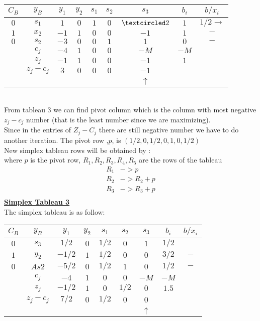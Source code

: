 \documentclass[12pt,a4paper]{article}
\begin{document}
		\begin{tabular}{cc|ccccc|cc}
			\hline 
			$C_B$& $y_B $&$ y_1$ & $y_2$ & $s_1$ & $s_2$ & $s_3$ & $b_i$ & $b/x_i$ \\ 
			\hline 
			$0$  &  $s_1$ & $1$ & $0$ & $$1$$ & $0$ & $\textcircled 2$   &$1$ & $1/2 \rightarrow$\\ 
			$1$ &  $x_2$ & $-1$ & $1$ & $0$ & $0$  & $-1$  & $1$& $-$\\ 
			$0$ &  $s_2$ & $-3$ & $0$ & $0$ & $1$ & $1$ & $0$  & $-$ \\ 
			\hline 
			& $ c_j$ & $-4$ & $1$ & $0$ & $0$  & $-M$ & $-M$   & \\ 
			\hline
			& $ z_j$ & $-1$ & $1$ & $0$ & $0$ & $-1$ & $1$  & \\ 
			\hline 
			&  $z_j-c_j$& $3$ & $0$ & $0$  & $0$ & $-1$  &  &\\ 
			\hline 
			&  &  &  &  &  & $\uparrow$ &  &    \\ 
		\end{tabular} \\
		From tableau 3 we can find pivot column which is the column with most negative $z_j-c_j$ number (that is the least number since we are maximizing). \\
		Since in the entries of $Z_j-C_j$ there are still negative number we have to do another iteration.
		The pivot row ,$p$, is $( 1/2,0,1/2,0, 1 , 0 , 1/2)$\\
		New simplex tableau rows will be obtained by :\\
		where $p$ is the pivot row, $R_1,R_2,R_3,R_4,R_5$ are the rows of the tableau
		\begin{align*}
		R_1 &-> p\\
		R_2 &-> R_2+p\\
		R_3 &-> R_3+p\\
		\end{align*}
		\textbf{\underline{Simplex Tableau 3}}\\
		The simplex tableau is as follow: \\
		
		\begin{tabular}{cc|ccccc|cc}
			\hline 
			$C_B$& $y_B $&$ y_1$ & $y_2$ & $s_1$ & $s_2$ & $s_3$ & $b_i$ & $b/x_i$ \\ 
			\hline 
			$0$  &  $s_3$ & $1/2$ & $0$ & $1/2$ & $0$ & $1$ & $1/2$&\\ 
			$1$ &  $y_2$ & $-1/2$ & $1$ & $1/2$ & $0$  & $0$  & $3/2$ & $-$\\ 
			$0$ &  $As2$ & $-5/2$ & $0$ & $1/2$ & $1$ & $0$ & $1/2$  & $-$ \\ 
			\hline 
			& $ c_j$ & $-4$ & $1$ & $0$ & $0 $ & $-M$ & $-M $  & \\ 
			\hline
			& $ z_j$ & $-1/2 $& $1 $& $0$ & $1/2$ & $0$ & $1.5$ &\\ 
			\hline 
			&  $z_j-c_j$& $7/2$ & $0$ & $1/2$  & $0$ & $0$  &  &\\ 
			\hline 
			&  &  &  &  &  & $\uparrow$ &  &    \\ 
		\end{tabular} \\
	
\end{document}
